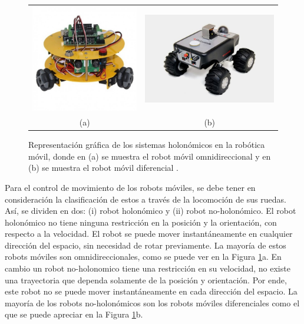 \begin{figure}%
      \begin{tabular}{cc}
        \includegraphics[width=.40\textwidth]{images/omnidirecional.jpg}&
        \includegraphics[width=.50\textwidth]{images/RM_noHolonomic.jpg}\\
        (a)&(b)
    \end{tabular}
  \captionsetup{font=footnotesize}
    \caption[Representación gráfica de los sistemas holonómicos en la robótica
    móvil, donde en (a) se muestra el robot móvil omnidireccional y en (b) se 
    muestra el robot móvil diferencial.]{Representación gráfica de los sistemas 
    holonómicos en la robótica móvil, donde en (a) se muestra el robot móvil 
    omnidireccional \cite{Omniwheel2018} y en (b) se muestra el robot móvil 
    diferencial \cite{NoHolonomic2018}.}
    \label{f:sLocomocion}
\end{figure}
Para el control de movimiento de los robots móviles, se debe tener en consideración 
la clasificación de estos a través de la locomoción de sus ruedas. Así, se dividen en dos: (i) robot holonómico y (ii) robot no-holonómico. El robot holonómico 
no tiene ninguna restricción en la posición y la orientación, con respecto a la 
velocidad. El robot se puede mover instantáneamente en cualquier dirección 
del espacio, sin necesidad de rotar previamente. La mayoría de estos robots 
móviles son omnidireccionales, como se puede ver en la Figura 
\ref{f:sLocomocion}a. En cambio un robot no-holonomico tiene una restricción 
en su velocidad, no existe una trayectoria que dependa solamente de la posición y 
orientación. Por ende, este robot no se puede mover instantáneamente en cada 
dirección del espacio. La mayoría de los robots no-holonómicos son los robots 
móviles diferenciales como el que se puede apreciar en la Figura \ref{f:sLocomocion}b.

